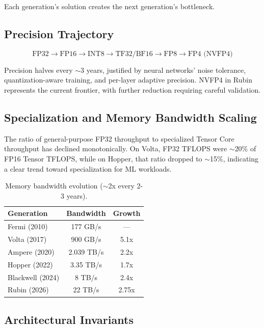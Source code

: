 \documentclass{article}
\begin{document}
Each generation's solution creates the next generation's bottleneck.

\subsection{Precision Trajectory}

\begin{equation}
\text{FP32} \to \text{FP16} \to \text{INT8} \to \text{TF32/BF16} \to \text{FP8} \to \text{FP4 (NVFP4)}
\end{equation}

Precision halves every $\sim$3 years, justified by neural networks' noise tolerance, quantization-aware training, and per-layer adaptive precision. NVFP4 in Rubin represents the current frontier, with further reduction requiring careful validation.

\subsection{Specialization and Memory Bandwidth Scaling}

The ratio of general-purpose FP32 throughput to specialized Tensor Core throughput has declined monotonically. On Volta, FP32 TFLOPS were $\sim$20\% of FP16 Tensor TFLOPS, while on Hopper, that ratio dropped to $\sim$15\%, indicating a clear trend toward specialization for ML workloads.

\begin{table}[h]
\centering
\footnotesize
\begin{tabular}{lcc}
\toprule
Generation & Bandwidth & Growth \\
\midrule
Fermi (2010) & 177 GB/s & --- \\
Volta (2017) & 900 GB/s & 5.1x \\
Ampere (2020) & 2.039 TB/s & 2.2x \\
Hopper (2022) & 3.35 TB/s & 1.7x \\
Blackwell (2024) & 8 TB/s & 2.4x \\
Rubin (2026) & 22 TB/s & 2.75x \\
\bottomrule
\end{tabular}
\caption{Memory bandwidth evolution ($\sim$2x every 2-3 years).}
\end{table}

\subsection{Architectural Invariants}
\end{document}
